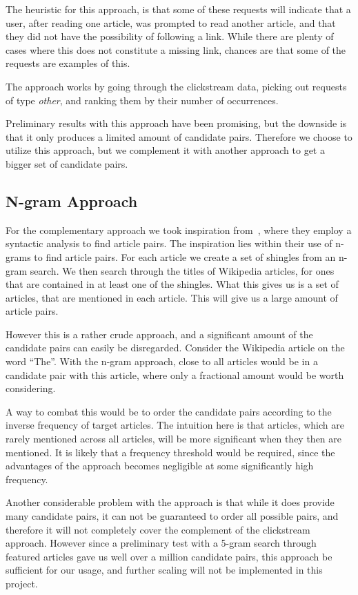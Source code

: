 The heuristic for this approach, is that some of these requests will indicate that a user, after reading one article, was prompted to read another article, and that they did not have the possibility of following a link. While there are plenty of cases where this does not constitute a missing link, chances are that some of the requests are examples of this.

The approach works by going through the clickstream data, picking out requests of type \emph{other}, and ranking them by their number of occurrences.

Preliminary results with this approach have been promising, but the downside is that it only produces a limited amount of candidate pairs. Therefore we choose to utilize this approach, but we complement it with another approach to get a bigger set of candidate pairs.

\subsection{N-gram Approach}

For the complementary approach we took inspiration from~\cite{milne2008learning}, where they employ a syntactic analysis to find article pairs. The inspiration lies within their use of n-grams to find article pairs. For each article we create a set of shingles from an n-gram search. We then search through the titles of Wikipedia articles, for ones that are contained in at least one of the shingles. What this gives us is a set of articles, that are mentioned in each article. This will give us a large amount of article pairs.

However this is a rather crude approach, and a significant amount of the candidate pairs can easily be disregarded. Consider the Wikipedia article on the word \enquote{The}. With the n-gram approach, close to all articles would be in a candidate pair with this article, where only a fractional amount would be worth considering.

A way to combat this would be to order the candidate pairs according to the inverse frequency of target articles. The intuition here is that articles, which are rarely mentioned across all articles, will be more significant when they then are mentioned. It is likely that a frequency threshold would be required, since the advantages of the approach becomes negligible at some significantly high frequency.

Another considerable problem with the approach is that while it does provide many candidate pairs, it can not be guaranteed to order all possible pairs, and therefore it will not completely cover the complement of the clickstream approach. However since a preliminary test with a 5-gram search through featured articles gave us well over a million candidate pairs, this approach be sufficient for our usage, and further scaling will not be implemented in this project.



